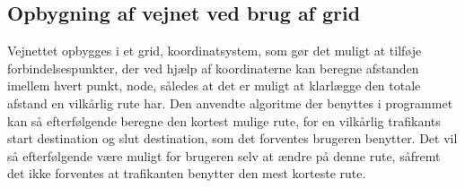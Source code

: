 \subsection*{Opbygning af vejnet ved brug af grid}
Vejnettet opbygges i et grid, koordinatsystem, som gør det muligt at tilføje forbindelsespunkter, der ved hjælp af koordinaterne kan beregne afstanden imellem hvert punkt, node, således at det er muligt at klarlægge den totale afstand en vilkårlig rute har. Den anvendte algoritme der benyttes i programmet kan så efterfølgende beregne den kortest mulige rute, for en vilkårlig trafikants start destination og slut destination, som det forventes brugeren benytter. Det vil så efterfølgende være muligt for brugeren selv at ændre på denne rute, såfremt det ikke forventes at trafikanten benytter den mest korteste rute.

